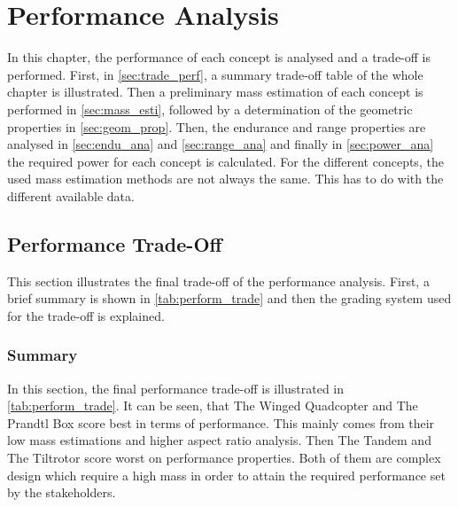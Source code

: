 \chapter{Performance Analysis}
\label{ch:perf_analy}

In this chapter, the performance of each concept is analysed and a trade-off is performed. First, in \autoref{sec:trade_perf}, a summary trade-off table of the whole chapter is illustrated. Then a preliminary mass estimation of each concept is performed in \autoref{sec:mass_esti}, followed by a determination of the geometric properties in \autoref{sec:geom_prop}. Then, the endurance and range properties are analysed in \autoref{sec:endu_ana} and \autoref{sec:range_ana} and finally in \autoref{sec:power_ana} the required power for each concept is calculated. For the different concepts, the used mass estimation methods are not always the same. This has to do with the different available data. 

\section{Performance Trade-Off}
\label{sec:trade_perf}

This section illustrates the final trade-off of the performance analysis. First, a brief summary is shown in \autoref{tab:perform_trade} and then the grading system used for the trade-off is explained.
\subsection{Summary}
\label{sec:perf_sum}

In this section, the final performance trade-off is illustrated in \autoref{tab:perform_trade}. It can be seen, that The Winged Quadcopter and The Prandtl Box score best in terms of performance. This mainly comes from their low mass estimations and higher aspect ratio analysis. Then The Tandem and The Tiltrotor score worst on performance properties. Both of them are complex design which require a high mass in order to attain the required performance set by the stakeholders. 

